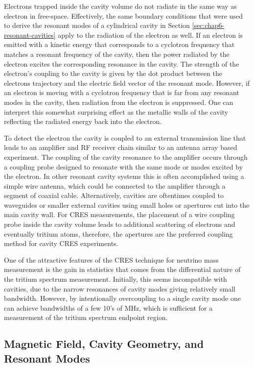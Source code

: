 Electrons trapped inside the cavity volume do not radiate in the same way as electron in free-space. Effectively, the same boundary conditions that were used to derive the resonant modes of a cylindrical cavity in Section \ref{sec:chap6-resonant-cavities} apply to the radiation of the electron as well. If an electron is emitted with a kinetic energy that corresponds to a cyclotron frequency that matches a resonant frequency of the cavity, then the power radiated by the electron excites the corresponding resonance in the cavity. The strength of the electron's coupling to the cavity is given by the dot product between the electrons trajectory and the electric field vector of the resonant mode. However, if an electron is moving with a cyclotron frequency that is far from any resonant modes in the cavity, then radiation from the electron is suppressed. One can interpret this somewhat surprising effect as the metallic walls of the cavity reflecting the radiated energy back into the electron. 

To detect the electron the cavity is coupled to an external transmission line that leads to an amplifier and RF receiver chain similar to an antenna array based experiment. The coupling of the cavity resonance to the amplifier occurs through a coupling probe designed to resonate with the same mode or modes excited by the electron. In other resonant cavity systems this is often accomplished using a simple wire antenna,  which could be connected to the amplifier through a segment of coaxial cable. Alternatively, cavities are oftentimes coupled to waveguides or smaller external cavities using small holes or apertures cut into the main cavity wall. For CRES measurements, the placement of a wire coupling probe inside the cavity volume leads to additional scattering of electrons and eventually tritium atoms, therefore, the apertures are the preferred coupling method for cavity CRES experiments.

One of the attractive features of the CRES technique for neutrino mass measurement is the gain in statistics that comes from the differential nature of the tritium spectrum measurement. Initially, this seems incompatible with cavities, due to the narrow resonances of cavity modes giving relatively small bandwidth. However, by intentionally overcoupling to a single cavity mode one can achieve bandwidths of a few 10's of MHz, which is sufficient for a measurement of the tritium spectrum endpoint region.  

\subsection{Magnetic Field, Cavity Geometry, and Resonant Modes}

